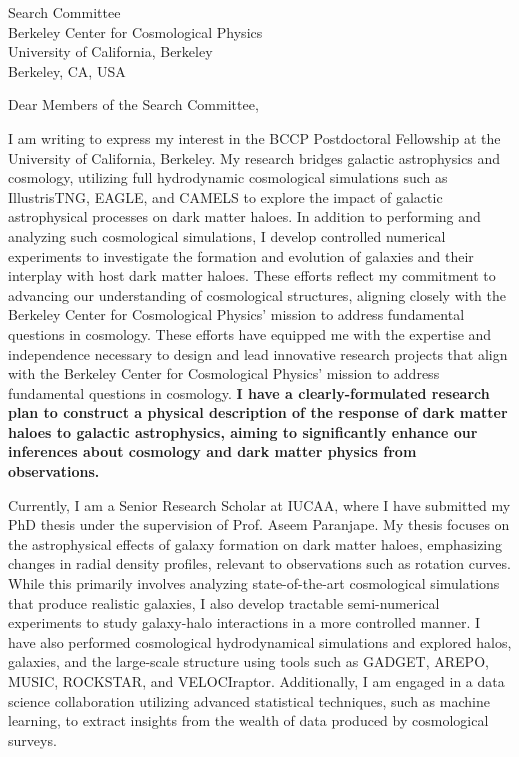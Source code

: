 \documentclass[11pt]{letter}
\begin{document}
\begin{letter}{Search Committee \\ Berkeley Center for Cosmological Physics \\ University of California, Berkeley \\ Berkeley, CA, USA}

\opening{Dear Members of the Search Committee,}

I am writing to express my interest in the BCCP Postdoctoral Fellowship at the University of California, Berkeley. My research bridges galactic astrophysics and cosmology, utilizing full hydrodynamic cosmological simulations such as IllustrisTNG, EAGLE, and CAMELS to explore the impact of galactic astrophysical processes on dark matter haloes. In addition to performing and analyzing such cosmological simulations, I develop controlled numerical experiments to investigate the formation and evolution of galaxies and their interplay with host dark matter haloes. These efforts reflect my commitment to advancing our understanding of cosmological structures, aligning closely with the Berkeley Center for Cosmological Physics' mission to address fundamental questions in cosmology. These efforts have equipped me with the expertise and independence necessary to design and lead innovative research projects that align with the Berkeley Center for Cosmological Physics' mission to address fundamental questions in cosmology. \textbf{I have a clearly-formulated research plan to construct a physical description of the response of dark matter haloes to galactic astrophysics, aiming to significantly enhance our inferences about cosmology and dark matter physics from observations.}

Currently, I am a Senior Research Scholar at IUCAA, where I have submitted my PhD thesis under the supervision of Prof. Aseem Paranjape. My thesis focuses on the astrophysical effects of galaxy formation on dark matter haloes, emphasizing changes in radial density profiles, relevant to observations such as rotation curves. While this primarily involves analyzing state-of-the-art cosmological simulations that produce realistic galaxies, I also develop tractable semi-numerical experiments to study galaxy-halo interactions in a more controlled manner. I have also performed cosmological hydrodynamical simulations and explored halos, galaxies, and the large-scale structure using tools such as GADGET, AREPO, MUSIC, ROCKSTAR, and VELOCIraptor. Additionally, I am engaged in a data science collaboration utilizing advanced statistical techniques, such as machine learning, to extract insights from the wealth of data produced by cosmological surveys.


\end{letter}
\end{document}
